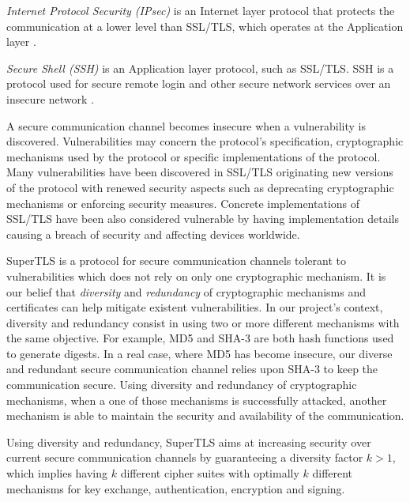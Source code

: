 \documentclass{sig-alternate-05-2015}
\begin{document}
\textit{Internet Protocol Security (IPsec)} is an Internet layer protocol that protects the communication at a lower level than SSL/TLS, which operates at the Application layer \cite{IPsec}.

\textit{Secure Shell (SSH)} is an Application layer protocol, such as SSL/TLS. SSH is a protocol used for secure remote login and other secure network services over an insecure network \cite{SSH}.

A secure communication channel becomes insecure when a vulnerability is discovered. Vulnerabilities may concern the protocol's specification, cryptographic mechanisms used by the protocol or specific implementations of the protocol. Many vulnerabilities have been discovered in SSL/TLS originating new versions of the protocol with renewed security aspects such as deprecating cryptographic mechanisms or enforcing security measures.
Concrete implementations of SSL/TLS have been also considered vulnerable by having implementation details causing a breach of security and affecting devices worldwide.

SuperTLS is a protocol for secure communication channels tolerant to vulnerabilities which does not rely on only one cryptographic mechanism. It is our belief that \textit{diversity} and \textit{redundancy} of cryptographic mechanisms and certificates can help mitigate existent vulnerabilities.
In our project's context, diversity and redundancy consist in using two or more different mechanisms with the same objective. For example, MD5 and SHA-3 are both hash functions used to generate digests. In a real case, where MD5 has become insecure, our diverse and redundant secure communication channel relies upon SHA-3 to keep the communication secure. Using diversity and redundancy of cryptographic mechanisms, when a one of those mechanisms is successfully attacked, another mechanism is able to maintain the security and availability of the communication.


Using diversity and redundancy, SuperTLS aims at increasing security over current secure communication channels by guaranteeing a diversity factor $k > 1$, which implies having $k$ different cipher suites with optimally $k$ different mechanisms for key exchange, authentication, encryption and signing.
\end{document}
